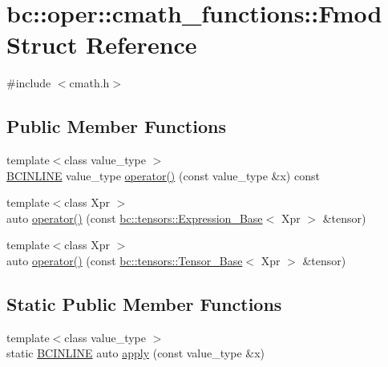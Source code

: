 \hypertarget{structbc_1_1oper_1_1cmath__functions_1_1Fmod}{}\section{bc\+:\+:oper\+:\+:cmath\+\_\+functions\+:\+:Fmod Struct Reference}
\label{structbc_1_1oper_1_1cmath__functions_1_1Fmod}


{\ttfamily \#include $<$cmath.\+h$>$}

\subsection*{Public Member Functions}
\begin{DoxyCompactItemize}
\item 
{\footnotesize template$<$class value\+\_\+type $>$ }\\\hyperlink{common_8h_a6699e8b0449da5c0fafb878e59c1d4b1}{B\+C\+I\+N\+L\+I\+NE} value\+\_\+type \hyperlink{structbc_1_1oper_1_1cmath__functions_1_1Fmod_a8aae440a5e7ac70ec7a1e9883a2bd11d}{operator()} (const value\+\_\+type \&x) const
\item 
{\footnotesize template$<$class Xpr $>$ }\\auto \hyperlink{structbc_1_1oper_1_1cmath__functions_1_1Fmod_a2c3c5f9bc0566e90fe25f65658e655a2}{operator()} (const \hyperlink{classbc_1_1tensors_1_1Expression__Base}{bc\+::tensors\+::\+Expression\+\_\+\+Base}$<$ Xpr $>$ \&tensor)
\item 
{\footnotesize template$<$class Xpr $>$ }\\auto \hyperlink{structbc_1_1oper_1_1cmath__functions_1_1Fmod_ad554887748de9eb02a6225b5067c38c9}{operator()} (const \hyperlink{classbc_1_1tensors_1_1Tensor__Base}{bc\+::tensors\+::\+Tensor\+\_\+\+Base}$<$ Xpr $>$ \&tensor)
\end{DoxyCompactItemize}
\subsection*{Static Public Member Functions}
\begin{DoxyCompactItemize}
\item 
{\footnotesize template$<$class value\+\_\+type $>$ }\\static \hyperlink{common_8h_a6699e8b0449da5c0fafb878e59c1d4b1}{B\+C\+I\+N\+L\+I\+NE} auto \hyperlink{structbc_1_1oper_1_1cmath__functions_1_1Fmod_a7fe6b5622b43559c87e80a7e9059e5cc}{apply} (const value\+\_\+type \&x)
\end{DoxyCompactItemize}


